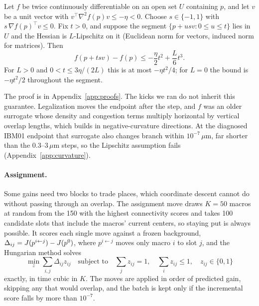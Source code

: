 \begin{proposition}\label{prop:curvature}
Let $f$ be twice continuously differentiable on an open set $U$ containing $p$, and
let $v$ be a unit vector with $v^\top\nabla^2 f(p)v\le-\eta<0$. Choose
$s\in\{-1,1\}$ with $s\,\nabla f(p)^\top v\le0$. Fix $t>0$, and suppose the segment
$\{p+usv:0\le u\le t\}$ lies in $U$ and the Hessian is $L$-Lipschitz on it
(Euclidean norm for vectors, induced norm for matrices). Then
\begin{equation}
 f(p+tsv)-f(p)\le-\frac{\eta}{2}t^2+\frac{L}{6}t^3.
 \label{eq:curvature-taylor}
\end{equation}
For $L>0$ and $0<t\le3\eta/(2L)$ this is at most $-\eta t^2/4$; for $L=0$ the bound is
$-\eta t^2/2$ throughout the segment.
\end{proposition}
\noindent The proof is in Appendix~\ref{app:proofs}. The kicks we ran do not inherit
this guarantee. Legalization moves the endpoint after the step, and $f$ was an older
surrogate whose density and congestion terms multiply horizontal by vertical overlap
lengths, which builds in negative-curvature directions. At the diagnosed IBM01
endpoint that surrogate also changes branch within $10^{-7}\,\mu$m, far shorter than
the 0.3--3\,$\mu$m steps, so the Lipschitz assumption fails (Appendix~\ref{app:curvature}).

\paragraph{Assignment.} Some gains need two blocks to trade places, which coordinate
descent cannot do without passing through an overlap. The assignment move draws $K=50$
macros at random from the 150 with the highest connectivity scores and takes 100
candidate slots that include the macros' current centers, so staying put is always
possible. It scores each single move against a frozen background,
$\Delta_{ij}=J(p^{i\leftarrow j})-J(p^0)$, where $p^{i\leftarrow j}$ moves
only macro $i$ to slot $j$, and the Hungarian method \citep{kuhn1955hungarian} solves
\begin{equation}
 \min_z\sum_{i,j}\Delta_{ij}z_{ij}
 \quad\text{subject to}\quad
 \sum_jz_{ij}=1,\quad\sum_iz_{ij}\le1,\quad z_{ij}\in\{0,1\}
 \label{eq:assignment-model}
\end{equation}
exactly, in time cubic in $K$. The moves are applied in order of predicted gain,
skipping any that would overlap, and the batch is kept only if the incremental score
falls by more than $10^{-7}$.

